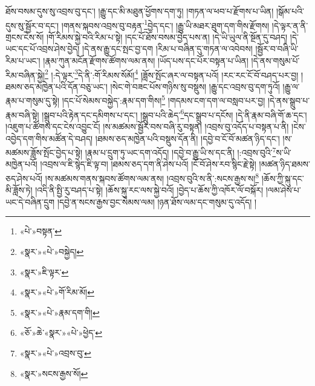 ཐོས་བསམ་དུས་སུ་འབྲས་བུ་དང་། །རྒྱུ་དང་མི་མཐུན་ཕྱོགས་དག་ཏུ། །གཏན་ལ་ཕབ་པ་རྫོགས་པ་ཡིན། །སྒོམ་པའི་དུས་སུ་སྦྱོར་བ་དང་། །གནས་སྐབས་འབྲས་བུ་བརྟན་\footnote{«པེ་»བསྟན་}བྱེད་དང་། །རྒྱུ་ཡི་མཐར་ཐུག་དག་གིས་རྫོགས། །དེ་ལྟར་ན་ནི་གྲངས་ངེས་སོ། །གོ་རིམས་སྐྱེ་བའི་རིམ་པ་སྟེ། །དང་པོ་ཐོས་བསམ་བྱེད་པས་ན། །དེ་ཡི་ཡུལ་ནི་སྔོན་དུ་བཤད། །དེ་ཡང་དང་པོ་འབྲས་ཤེས་བྱེད། །དེ་ནས་རྒྱུ་དང་སྤང་བྱ་དག །རིམ་པ་བཞིན་དུ་གཏན་ལ་འབེབས། །སྦྱོར་བ་བཞི་ཡི་རིམ་པ་ཡང་། །རྣམ་ཀུན་མངོན་རྫོགས་ཚོགས་ལམ་ནས། །ཡོད་པས་དང་པོར་བསྟན་པ་ཡིན། །དེ་ནས་གསུམ་པོ་རིམ་བཞིན་སྐྱེ།\footnote{«སྣར་»«པེ་»བསྐྱེད།} །:དེ་ལྟར་\footnote{«སྣར་»ཇི་ལྟར་}དེ་ནི་:གོ་རིམས་སོམོ།\footnote{«སྣར་»«པེ་»གོ་རིམ་མོ།} །ཟློས་སྤོང་ཞར་ལ་བསྟན་པའོ། །རང་རང་ངོ་བོ་བཤད་པར་བྱ། །ཐམས་ཅད་མཁྱེན་པའི་དོན་བཅུ་ཡང་། །སེང་གེ་བཟང་པོས་གཉིས་སུ་བསྡུས། །རྒྱུ་དང་འབྲས་བུ་དག་ཏུའོ། །རྒྱུ་ལ་རྣམ་པ་གསུམ་དུ་སྟེ། །དང་པོ་སེམས་བསྐྱེད་:རྣམ་དག་གིས།\footnote{«སྣར་»«པེ་»རྣམ་དག་གི།} །གདམས་ངག་དག་ལ་བསླབ་པར་བྱ། །དེ་ནས་སྒྲུབ་པ་རྣམ་བཞི་སྟེ། །སྒྲུབ་པའི་རྟེན་དང་དམིགས་པ་དང་། །སྒྲུབ་པའི་ཆེད་\footnote{«ཅོ་»ཆེ་«སྣར་»«པེ་»ཕྱེད་}དང་སྒྲུབ་པ་དངོས། །དེ་ནི་རྣམ་བཞི་གོ་ཆ་དང་། །འཇུག་པ་ཚོགས་དང་ངེས་འབྱུང་ངོ། །ས་མཚམས་སྦྱོར་བས་བཞི་རུ་བསྟན། །འབྲས་བུ་འདོད་པ་བསྟན་པ་ནི། །ངེས་འབྱེད་དག་གིས་མཚོན་དེ་བཤད། །ཐམས་ཅད་མཁྱེན་པའི་བསྡུས་དོན་ནི། །དབྱེ་བ་ངོ་བོ་མཚན་ཉིད་དང་། །ས་མཚམས་ཟློས་སྤོང་བྱེད་པ་སྟེ། །རྣམ་པ་དྲུག་ཏུ་ཡང་དག་འདོད། །དབྱེ་བ་རྒྱུ་ཡི་ས་དང་ནི། །:འབྲས་བུའི་\footnote{«སྣར་»«པེ་»འབྲས་བུ་}ས་ཡི་མཁྱེན་པའོ། །འབྲས་ལ་ཇི་སྙེད་ཇི་ལྟ་བ། །ཐམས་ཅད་དག་ནི་ཤེས་པའོ། །ངོ་བོ་ཤེས་རབ་སྙིང་རྗེ་སྟེ། །མཚན་ཉིད་ཐམས་ཅད་ཤེས་པའོ། །ས་མཚམས་གནས་སྐབས་ཚོགས་ལམ་ནས། །འབྲས་བུའི་ས་ནི་:སངས་རྒྱས་ས།\footnote{«སྣར་»སངས་རྒྱས་སོ།} །ཆོས་ཀྱི་སྐུ་དང་མི་ཟློས་ཏེ། །འདི་ནི་སྤྱི་རུ་བཤད་པ་སྟེ། །ཆོས་སྐུ་རང་ལས་སྐྱེ་བའོ། །བྱེད་པ་ཆོས་ཀྱི་འཁོར་ལོ་བསྐོར། །ལམ་ཤེས་པ་ཡང་དེ་བཞིན་དྲུག །དབྱེ་ན་སངས་རྒྱས་བྱང་སེམས་ལམ། །ཉན་ཐོས་ལམ་དང་གསུམ་དུ་འདོད། །
